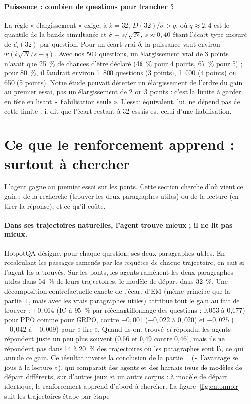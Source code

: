 \documentclass[11pt,a4paper]{article}
\begin{document}
\paragraph{Puissance : combien de questions pour trancher ?} La règle « élargissement » exige, à $k = 32$, $D(32)/\hat\sigma > q$, où $q \approx 2{,}4$ est le quantile de la bande simultanée et $\hat\sigma = s/\sqrt{N}$, $s \approx 0{,}40$ étant l'écart-type mesuré de $d_i(32)$ par question. Pour un écart vrai $\delta$, la puissance vaut environ $\Phi(\delta\sqrt{N}/s - q)$. Avec nos 500 questions, un élargissement vrai de 3 points n'avait que 25~\% de chances d'être déclaré (46~\% pour 4 points, 67~\% pour 5) ; pour 80~\%, il faudrait environ 1~800 questions (3 points), 1~000 (4 points) ou 650 (5 points). Notre étude pouvait détecter un élargissement de l'ordre du gain au premier essai, pas un élargissement de 2 ou 3 points : c'est la limite à garder en tête en lisant « fiabilisation seule ». L'essai équivalent, lui, ne dépend pas de cette limite : il dit que l'écart restant à 32 essais est celui d'une fiabilisation.

\section{Ce que le renforcement apprend : surtout à chercher}\label{sec:apprend-p2}

L'agent gagne au premier essai sur les ponts. Cette section cherche d'où vient ce gain : de la recherche (trouver les deux paragraphes utiles) ou de la lecture (en tirer la réponse), et ce qu'il coûte.

\paragraph{Dans ses trajectoires naturelles, l'agent trouve mieux ; il ne lit pas mieux.} HotpotQA désigne, pour chaque question, ses deux paragraphes utiles. En recalculant les passages ramenés par les requêtes de chaque trajectoire, on sait si l'agent les a trouvés. Sur les ponts, les agents ramènent les deux paragraphes utiles dans 54~\% de leurs trajectoires, le modèle de départ dans 32~\%. Une décomposition contrefactuelle exacte de l'écart d'EM (même principe que la partie~1, mais avec les vrais paragraphes utiles) attribue tout le gain au fait de trouver : $+0{,}064$ (IC à 95~\% par rééchantillonnage des questions : 0,053 à 0,077) pour PPO comme pour GRPO, contre $+0{,}001$ ($-0{,}022$ à $0{,}020$) et $-0{,}025$ ($-0{,}042$ à $-0{,}009$) pour « lire ». Quand ils ont trouvé \emph{et} répondu, les agents répondent juste un peu plus souvent (0,56 et 0,49 contre 0,46), mais ils ne répondent pas dans 14 à 20~\% des trajectoires où les paragraphes sont là, ce qui annule ce gain. Ce résultat inverse la conclusion de la partie~1 (« l'avantage se joue à la lecture »), qui comparait des agents et des harnais issus de modèles de départ différents, sur d'autres jeux et un autre corpus : à modèle de départ identique, le renforcement apprend d'abord à chercher. La figure~\ref{fig:entonnoir} suit les trajectoires étape par étape.
\end{document}
